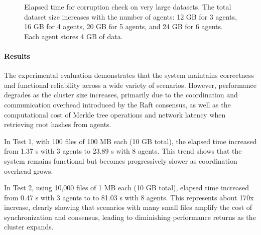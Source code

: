 \begin{figure}[!ht]
\centering
{}
\caption{Elapsed time for corruption check on very large datasets. The total dataset size increases
    with the number of agents: 12 GB for 3 agents, 16 GB for 4 agents, 20 GB
    for 5 agents, and 24 GB for 6 agents. Each agent stores 4 GB of data.}
\label{fig:test-4}
\end{figure}

\newpage

\paragraph{Results}

The experimental evaluation demonstrates that the system maintains correctness and functional reliability across a wide variety of scenarios. However, performance degrades as the cluster size increases, primarily due to the coordination and communication overhead introduced by the Raft consensus, as well as the computational cost of Merkle tree operations and network latency when retrieving root hashes from agents.

In Test 1, with 100 files of 100 MB each (10 GB total), the elapsed time increased from 1.37 s with 3 agents to 23.89 s with 8 agents. This trend shows that the system remains functional but becomes progressively slower as coordination overhead grows.

In Test 2, using 10,000 files of 1 MB each (10 GB total), elapsed time increased
from 0.47 s with 3 agents to to 81.03 s with 8 agents. This represents about
170x increase, clearly showing that scenarios with many small files amplify the cost of synchronization and consensus, leading to diminishing performance returns as the cluster expands.

